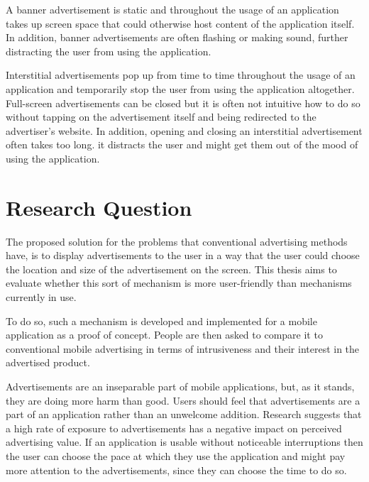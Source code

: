 A banner advertisement is static and throughout the usage of an application takes up screen space that could otherwise host content of the application itself. In addition, banner advertisements are often flashing or making sound, further distracting the user from using the application.

Interstitial advertisements pop up from time to time throughout the usage of an application and temporarily stop the user from using the application altogether. Full-screen advertisements can be closed but it is often not intuitive how to do so without tapping on the advertisement itself and being redirected to the advertiser's website. In addition, opening and closing an interstitial advertisement often takes too long. it distracts the user and might get them out of the mood of using the application.


\section{Research Question}

The proposed solution for the problems that conventional advertising methods have, is to display advertisements to the user in a way that the user could choose the location and size of the advertisement on the screen. This thesis aims to evaluate whether this sort of mechanism is more user-friendly than mechanisms currently in use.

To do so, such a mechanism is developed and implemented for a mobile application as a proof of concept. People are then asked to compare it to conventional mobile advertising in terms of intrusiveness and their interest in the advertised product.

Advertisements are an inseparable part of mobile applications, but, as it stands, they are doing more harm than good. Users should feel that advertisements are a part of an application rather than an unwelcome addition. Research suggests that a high rate of exposure to advertisements has a negative impact on perceived advertising value\cite{parissa2005increasingadvalue}\cite{consumer2004melody}. If an application is usable without noticeable interruptions then the user can choose the pace at which they use the application and might pay more attention to the advertisements, since they can choose the time to do so.

